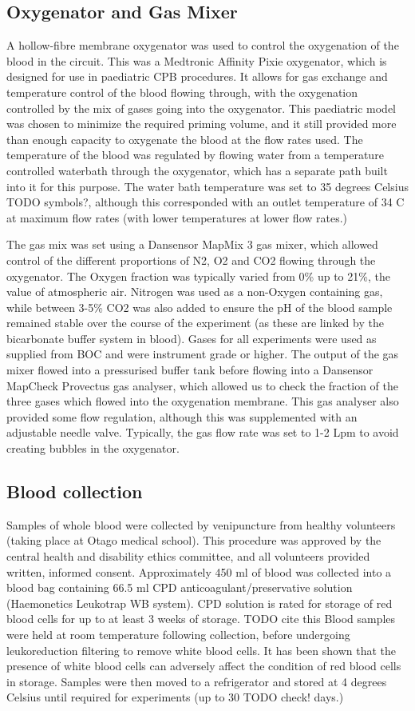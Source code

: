 \subsection{Oxygenator and Gas Mixer}
A hollow-fibre membrane oxygenator was used to control the oxygenation of the blood in the circuit.
This was a Medtronic Affinity Pixie oxygenator, which is designed for use in paediatric CPB procedures.
It allows for gas exchange and temperature control of the blood flowing through, with the oxygenation controlled by the mix of gases going into the oxygenator.
This paediatric model was chosen to minimize the required priming volume, and it still provided more than enough capacity to oxygenate the blood at the flow rates used.
The temperature of the blood was regulated by flowing water from a temperature controlled waterbath through the oxygenator, which has a separate path built into it for this purpose.
The water bath temperature was set to 35 degrees Celsius TODO symbols?, although this corresponded with an outlet temperature of 34 C at maximum flow rates (with lower temperatures at lower flow rates.)

The gas mix was set using a Dansensor MapMix 3 gas mixer, which allowed control of the different proportions of N2, O2 and CO2 flowing through the oxygenator.
The Oxygen fraction was typically varied from 0\% up to 21\%, the value of atmospheric air.
Nitrogen was used as a non-Oxygen containing gas, while between 3-5\% CO2 was also added to ensure the pH of the blood sample remained stable over the course of the experiment (as these are linked by the bicarbonate buffer system in blood).
Gases for all experiments were used as supplied from BOC and were instrument grade or higher.
The output of the gas mixer flowed into a pressurised buffer tank before flowing into a Dansensor MapCheck Provectus gas analyser, which allowed us to check the fraction of the three gases which flowed into the oxygenation membrane.
This gas analyser also provided some flow regulation, although this was supplemented with an adjustable needle valve.
Typically, the gas flow rate was set to 1-2 Lpm to avoid creating bubbles in the oxygenator.

\subsection{Blood collection}
Samples of whole blood were collected by venipuncture from healthy volunteers (taking place at Otago medical school).
This procedure was approved by the central health and disability ethics committee, and all volunteers provided written, informed consent.
Approximately 450 ml of blood was collected into a blood bag containing 66.5 ml CPD anticoagulant/preservative solution (Haemonetics Leukotrap WB system).
CPD solution is rated for storage of red blood cells for up to at least 3 weeks of storage. TODO cite this
Blood samples were held at room temperature following collection, before undergoing leukoreduction filtering to remove white blood cells.
It has been shown that the presence of white blood cells can adversely affect the condition of red blood cells in storage.
Samples were then moved to a refrigerator and stored at 4 degrees Celsius until required for experiments (up to 30 TODO check! days.)

